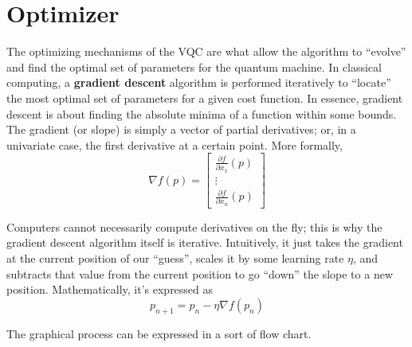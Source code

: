 \documentclass[12pt]{article}
\begin{document}
\section{Optimizer}
    The optimizing mechanisms of the VQC are what allow the algorithm to ``evolve'' and find the optimal set of parameters for the quantum 
    machine. 
    In classical computing, a \textbf{gradient descent} algorithm is performed iteratively to ``locate'' the most optimal set of parameters for a given 
    cost function. In essence, gradient descent is about finding the absolute minima of a function within some bounds. \\
    The gradient (or slope) is simply a vector of partial derivatives; or, in a univariate case, the first derivative at a certain point. 
    More formally, 
    \[\nabla f(p) = \begin{bmatrix}
        \frac{\partial f}{\partial x_1} (p) \\ 
        \vdots \\
        \frac{\partial f}{\partial x_n}(p)
    \end{bmatrix}\]
    
    Computers cannot necessarily compute derivatives on the fly; this is why the gradient descent algorithm itself is iterative. 
    Intuitively, it just takes the gradient at the current position of our ``guess'', scales it by some learning rate $\eta$, and subtracts that value from
    the current position to go ``down'' the slope to a new position.
    Mathematically, it's expressed as 
    \[p_{n+1} = p_n - \eta \nabla f(p_n)\]

    The graphical process can be expressed in a sort of flow chart.
    \begin{center}

    \end{center}
\end{document}
